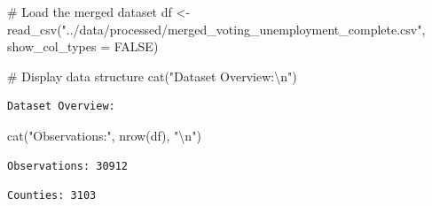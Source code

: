 \documentclass[
  11pt,
]{article}
\newenvironment{Shaded}{\begin{snugshade}}{\end{snugshade}}
\newcommand{\AttributeTok}[1]{\textcolor[rgb]{0.40,0.45,0.13}{#1}}
\newcommand{\CommentTok}[1]{\textcolor[rgb]{0.37,0.37,0.37}{#1}}
\newcommand{\ConstantTok}[1]{\textcolor[rgb]{0.56,0.35,0.01}{#1}}
\newcommand{\FunctionTok}[1]{\textcolor[rgb]{0.28,0.35,0.67}{#1}}
\newcommand{\NormalTok}[1]{\textcolor[rgb]{0.00,0.23,0.31}{#1}}
\newcommand{\OtherTok}[1]{\textcolor[rgb]{0.00,0.23,0.31}{#1}}
\newcommand{\SpecialCharTok}[1]{\textcolor[rgb]{0.37,0.37,0.37}{#1}}
\newcommand{\StringTok}[1]{\textcolor[rgb]{0.13,0.47,0.30}{#1}}
\begin{document}
\begin{Shaded}
\begin{Highlighting}[]
\CommentTok{\# Load the merged dataset}
\NormalTok{df }\OtherTok{\textless{}{-}} \FunctionTok{read\_csv}\NormalTok{(}\StringTok{"../data/processed/merged\_voting\_unemployment\_complete.csv"}\NormalTok{,}
               \AttributeTok{show\_col\_types =} \ConstantTok{FALSE}\NormalTok{)}

\CommentTok{\# Display data structure}
\FunctionTok{cat}\NormalTok{(}\StringTok{"Dataset Overview:}\SpecialCharTok{\textbackslash{}n}\StringTok{"}\NormalTok{)}
\end{Highlighting}
\end{Shaded}

\begin{verbatim}
Dataset Overview:
\end{verbatim}

\begin{Shaded}
\begin{Highlighting}[]
\FunctionTok{cat}\NormalTok{(}\StringTok{"Observations:"}\NormalTok{, }\FunctionTok{nrow}\NormalTok{(df), }\StringTok{"}\SpecialCharTok{\textbackslash{}n}\StringTok{"}\NormalTok{)}
\end{Highlighting}
\end{Shaded}

\begin{verbatim}
Observations: 30912 
\end{verbatim}

\begin{Shaded}
\end{Shaded}

\begin{verbatim}
Counties: 3103 
\end{verbatim}

\begin{Shaded}
\end{Shaded}
\end{document}
